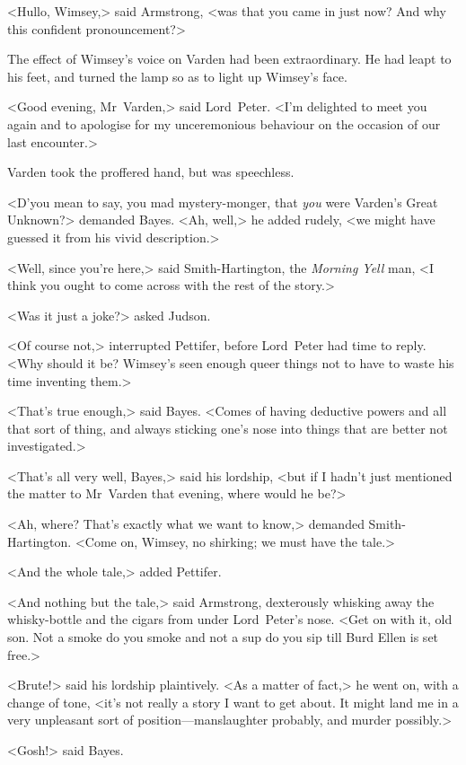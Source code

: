 <Hullo, Wimsey,> said Armstrong, <was that you came in just now? And why this confident pronouncement?>

The effect of Wimsey's voice on Varden had been extraordinary. He had leapt to his feet, and turned the lamp so as to light up Wimsey's face.

<Good evening, Mr~Varden,> said Lord~Peter. <I'm delighted to meet you again and to apologise for my unceremonious behaviour on the occasion of our last encounter.>

Varden took the proffered hand, but was speechless.

<D'you mean to say, you mad mystery-monger, that \textit{you} were Varden's Great Unknown?> demanded Bayes. <Ah, well,> he added rudely, <we might have guessed it from his vivid description.>

<Well, since you're here,> said Smith-Hartington, the \textit{Morning Yell} man, <I think you ought to come across with the rest of the story.>

<Was it just a joke?> asked Judson.

<Of course not,> interrupted Pettifer, before Lord~Peter had time to reply. <Why should it be? Wimsey's seen enough queer things not to have to waste his time inventing them.>

<That's true enough,> said Bayes. <Comes of having deductive powers and all that sort of thing, and always sticking one's nose into things that are better not investigated.>

<That's all very well, Bayes,> said his lordship, <but if I hadn't just mentioned the matter to Mr~Varden that evening, where would he be?>

<Ah, where? That's exactly what we want to know,> demanded Smith-Hartington. <Come on, Wimsey, no shirking; we must have the tale.>

<And the whole tale,> added Pettifer.

<And nothing but the tale,> said Armstrong, dexterously whisking away the whisky-bottle and the cigars from under Lord~Peter's nose. <Get on with it, old son. Not a smoke do you smoke and not a sup do you sip till Burd Ellen is set free.>

<Brute!> said his lordship plaintively. <As a matter of fact,> he went on, with a change of tone, <it's not really a story I want to get about. It might land me in a very unpleasant sort of position—manslaughter probably, and murder possibly.>

<Gosh!> said Bayes.

